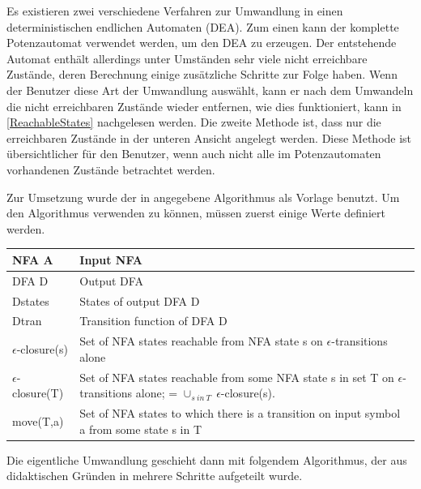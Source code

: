 Es existieren zwei verschiedene Verfahren zur Umwandlung in einen
deterministischen endlichen Automaten (DEA). Zum einen kann der komplette
Potenzautomat verwendet werden, um den DEA zu erzeugen. Der entstehende Automat
enthält allerdings unter Umständen sehr viele nicht erreichbare Zustände, deren
Berechnung einige zusätzliche Schritte zur Folge haben. Wenn der Benutzer diese
Art der Umwandlung auswählt, kann er nach dem Umwandeln die nicht erreichbaren
Zustände wieder entfernen, wie dies funktioniert, kann in \ref{ReachableStates}
nachgelesen werden. Die zweite Methode ist, dass nur die erreichbaren Zustände
in der unteren Ansicht angelegt werden. Diese Methode ist übersichtlicher für
den Benutzer, wenn auch nicht alle im Potenzautomaten vorhandenen Zustände
betrachtet werden.\vspace{10pt}

Zur Umsetzung wurde der in  angegebene Algorithmus
als Vorlage benutzt. Um den Algorithmus verwenden zu können, müssen zuerst einige
Werte definiert werden.\vspace{10pt}


\noindent
\begin{tabular}{|p{2.2cm}|p{9.0cm}|}
  \hline
  NFA A                 & Input NFA \\
  \hline
  DFA D                 & Output DFA \\
  \hline
  Dstates               & States of output DFA D \\
  \hline
  Dtran                 & Transition function of DFA D \\
  \hline
  $\epsilon$-closure(s) & Set of NFA states reachable from NFA state s
                          on $\epsilon$-transitions alone \\
  \hline
  $\epsilon$-closure(T) & Set of NFA states reachable from some NFA state s
                          in set T on $\epsilon$-transitions alone; =
                          $\cup_{s\ in\ T}\ \epsilon$-closure(s). \\
  \hline
  move(T,a)             & Set of NFA states to which there is a transition
                          on input symbol a from some state s in T \\
  \hline
\end{tabular}
\vspace{10pt}

Die eigentliche Umwandlung geschieht dann mit folgendem Algorithmus, der aus
didaktischen Gründen in mehrere Schritte aufgeteilt wurde.\vspace{10pt}

